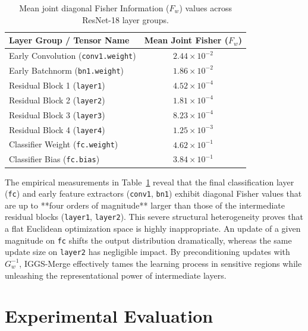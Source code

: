 \documentclass{article}
\theoremstyle{plain}
\theoremstyle{definition}
\theoremstyle{remark}
\begin{document}
\begin{table}[h]
\caption{Mean joint diagonal Fisher Information ($F_w$) values across ResNet-18 layer groups.}
\label{tab:fisher_values}
\vskip 0.1in
\begin{center}
\begin{footnotesize}
\begin{tabular}{lc}
\toprule
Layer Group / Tensor Name & Mean Joint Fisher ($F_w$) \\
\midrule
Early Convolution (\texttt{conv1.weight}) & $2.44 \times 10^{-2}$ \\
Early Batchnorm (\texttt{bn1.weight}) & $1.86 \times 10^{-2}$ \\
Residual Block 1 (\texttt{layer1}) & $4.52 \times 10^{-4}$ \\
Residual Block 2 (\texttt{layer2}) & $1.81 \times 10^{-4}$ \\
Residual Block 3 (\texttt{layer3}) & $8.23 \times 10^{-4}$ \\
Residual Block 4 (\texttt{layer4}) & $1.25 \times 10^{-3}$ \\
Classifier Weight (\texttt{fc.weight}) & $4.62 \times 10^{-1}$ \\
Classifier Bias (\texttt{fc.bias}) & $3.84 \times 10^{-1}$ \\
\bottomrule
\end{tabular}
\end{footnotesize}
\end{center}
\vskip -0.1in
\end{table}

The empirical measurements in Table~\ref{tab:fisher_values} reveal that the final classification layer (\texttt{fc}) and early feature extractors (\texttt{conv1}, \texttt{bn1}) exhibit diagonal Fisher values that are up to **four orders of magnitude** larger than those of the intermediate residual blocks (\texttt{layer1}, \texttt{layer2}). This severe structural heterogeneity proves that a flat Euclidean optimization space is highly inappropriate. An update of a given magnitude on \texttt{fc} shifts the output distribution dramatically, whereas the same update size on \texttt{layer2} has negligible impact. By preconditioning updates with $G_w^{-1}$, IGGS-Merge effectively tames the learning process in sensitive regions while unleashing the representational power of intermediate layers.

\section{Experimental Evaluation}
\end{document}
